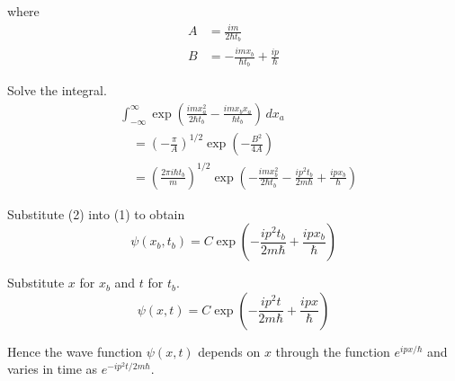 where
\begin{align*}
A&=\frac{im}{2\hbar t_b}
\\
B&=-\frac{imx_b}{\hbar t_b}+\frac{ip}{\hbar}
\end{align*}

Solve the integral.
\begin{align*}
&\int_{-\infty}^\infty
\exp\left(\frac{imx_a^2}{2\hbar t_b}-\frac{imx_bx_a}{\hbar t_b}\right)\,dx_a
\\
&\quad{}=\left(-\frac{\pi}{A}\right)^{1/2}\exp\left(-\frac{B^2}{4A}\right)
\\
&\quad{}=\left(\frac{2\pi i\hbar t_b}{m}\right)^{1/2}
\exp\left(-\frac{i m x_b^2}{2\hbar t_b}-\frac{ip^2t_b}{2m\hbar}+\frac{ipx_b}{\hbar}\right)
\tag{2}
\end{align*}

Substitute (2) into (1) to obtain
\begin{equation*}
\psi(x_b,t_b)
=C\exp\left(-\frac{ip^2t_b}{2m\hbar}+\frac{ipx_b}{\hbar}\right)
\end{equation*}

Substitute $x$ for $x_b$ and $t$ for $t_b$.
\begin{equation*}
\psi(x,t)
=C\exp\left(-\frac{ip^2t}{2m\hbar}+\frac{ipx}{\hbar}\right)
\end{equation*}

Hence the wave function $\psi(x,t)$ depends on $x$ through the
function $e^{ipx/\hbar}$ and varies in time as
$e^{-ip^2t/2m\hbar}$.


